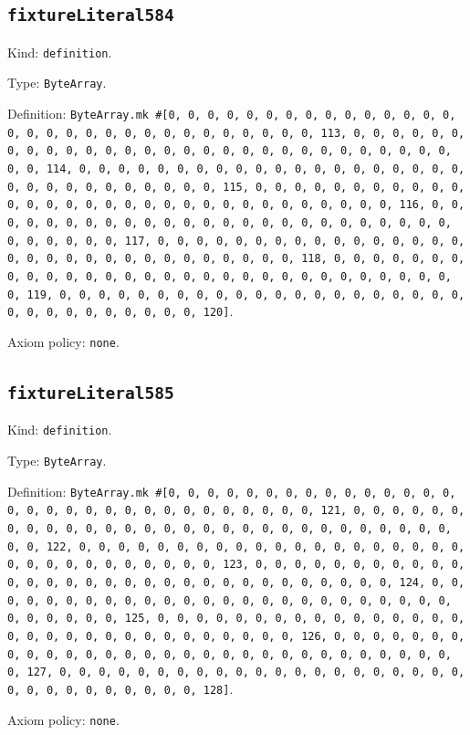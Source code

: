 \documentclass[11pt]{article}
\begin{document}
\subsection*{\texttt{fixtureLiteral584}}
\noindent Kind: \texttt{definition}.\par
\noindent Type: \texttt{ByteArray}.\par
\noindent Definition: \texttt{ByteArray.mk \#[0, 0, 0, 0, 0, 0, 0, 0, 0, 0, 0, 0, 0, 0, 0, 0, 0, 0, 0, 0, 0, 0, 0, 0, 0, 0, 0, 0, 0, 0, 0, 113, 0, 0, 0, 0, 0, 0, 0, 0, 0, 0, 0, 0, 0, 0, 0, 0, 0, 0, 0, 0, 0, 0, 0, 0, 0, 0, 0, 0, 0, 0, 0, 114, 0, 0, 0, 0, 0, 0, 0, 0, 0, 0, 0, 0, 0, 0, 0, 0, 0, 0, 0, 0, 0, 0, 0, 0, 0, 0, 0, 0, 0, 0, 0, 115, 0, 0, 0, 0, 0, 0, 0, 0, 0, 0, 0, 0, 0, 0, 0, 0, 0, 0, 0, 0, 0, 0, 0, 0, 0, 0, 0, 0, 0, 0, 0, 116, 0, 0, 0, 0, 0, 0, 0, 0, 0, 0, 0, 0, 0, 0, 0, 0, 0, 0, 0, 0, 0, 0, 0, 0, 0, 0, 0, 0, 0, 0, 0, 117, 0, 0, 0, 0, 0, 0, 0, 0, 0, 0, 0, 0, 0, 0, 0, 0, 0, 0, 0, 0, 0, 0, 0, 0, 0, 0, 0, 0, 0, 0, 0, 118, 0, 0, 0, 0, 0, 0, 0, 0, 0, 0, 0, 0, 0, 0, 0, 0, 0, 0, 0, 0, 0, 0, 0, 0, 0, 0, 0, 0, 0, 0, 0, 119, 0, 0, 0, 0, 0, 0, 0, 0, 0, 0, 0, 0, 0, 0, 0, 0, 0, 0, 0, 0, 0, 0, 0, 0, 0, 0, 0, 0, 0, 0, 0, 120]}.\par
\noindent Axiom policy: \texttt{none}.\par
\subsection*{\texttt{fixtureLiteral585}}
\noindent Kind: \texttt{definition}.\par
\noindent Type: \texttt{ByteArray}.\par
\noindent Definition: \texttt{ByteArray.mk \#[0, 0, 0, 0, 0, 0, 0, 0, 0, 0, 0, 0, 0, 0, 0, 0, 0, 0, 0, 0, 0, 0, 0, 0, 0, 0, 0, 0, 0, 0, 0, 121, 0, 0, 0, 0, 0, 0, 0, 0, 0, 0, 0, 0, 0, 0, 0, 0, 0, 0, 0, 0, 0, 0, 0, 0, 0, 0, 0, 0, 0, 0, 0, 122, 0, 0, 0, 0, 0, 0, 0, 0, 0, 0, 0, 0, 0, 0, 0, 0, 0, 0, 0, 0, 0, 0, 0, 0, 0, 0, 0, 0, 0, 0, 0, 123, 0, 0, 0, 0, 0, 0, 0, 0, 0, 0, 0, 0, 0, 0, 0, 0, 0, 0, 0, 0, 0, 0, 0, 0, 0, 0, 0, 0, 0, 0, 0, 124, 0, 0, 0, 0, 0, 0, 0, 0, 0, 0, 0, 0, 0, 0, 0, 0, 0, 0, 0, 0, 0, 0, 0, 0, 0, 0, 0, 0, 0, 0, 0, 125, 0, 0, 0, 0, 0, 0, 0, 0, 0, 0, 0, 0, 0, 0, 0, 0, 0, 0, 0, 0, 0, 0, 0, 0, 0, 0, 0, 0, 0, 0, 0, 126, 0, 0, 0, 0, 0, 0, 0, 0, 0, 0, 0, 0, 0, 0, 0, 0, 0, 0, 0, 0, 0, 0, 0, 0, 0, 0, 0, 0, 0, 0, 0, 127, 0, 0, 0, 0, 0, 0, 0, 0, 0, 0, 0, 0, 0, 0, 0, 0, 0, 0, 0, 0, 0, 0, 0, 0, 0, 0, 0, 0, 0, 0, 0, 128]}.\par
\noindent Axiom policy: \texttt{none}.\par
\end{document}
